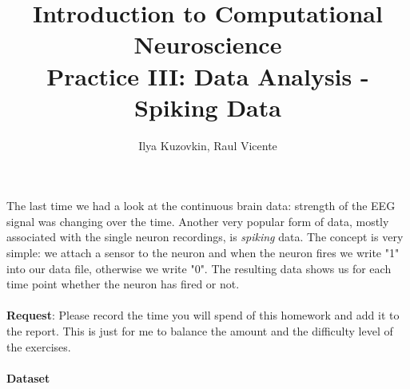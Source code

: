 \documentclass[a4paper,11pt]{article}
\author{\large{Ilya Kuzovkin, Raul Vicente}}
\title{\huge{Introduction to Computational Neuroscience}\\\LARGE{Practice III: Data Analysis - Spiking Data}}
\begin{document}
\maketitle

The last time we had a look at the continuous brain data: strength of the EEG signal was changing over the time. Another very popular form of data, mostly associated with the single neuron recordings, is \emph{spiking} data. The concept is very simple: we attach a sensor to the neuron and when the neuron fires we write "1" into our data file, otherwise we write "0". The resulting data shows us for each time point whether the neuron has fired or not.\\
\ \\
\textbf{Request}: Please record the time you will spend of this homework and add it to the report. This is just for me to balance the amount and the difficulty level of the exercises.\\
\ \\
\textbf{Dataset}
\end{document}
